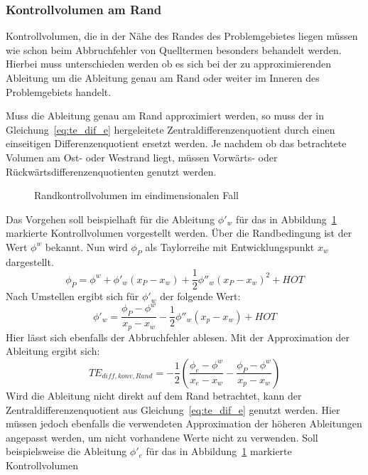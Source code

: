 \subsubsection{Kontrollvolumen am Rand}
\label{sec:te_dif_rand}

Kontrollvolumen, die in der Nähe des Randes des Problemgebietes liegen müssen wie schon beim
Abbruchfehler von Quelltermen besonders behandelt werden. Hierbei muss unterschieden werden ob es sich
bei der zu approximierenden Ableitung um die Ableitung genau am Rand oder weiter im Inneren des
Problemgebiets handelt.

Muss die Ableitung genau am Rand approximiert werden, so muss der in Gleichung~\ref{eq:te_dif_e} hergeleitete
Zentraldifferenzenquotient durch einen einseitigen Differenzenquotient ersetzt werden. Je nachdem ob das
betrachtete Volumen am Ost- oder Westrand liegt, müssen Vorwärts- oder Rückwärtsdifferenzenquotienten genutzt werden.
\begin{figure}[hb]

\centering
\caption{Randkontrollvolumen im eindimensionalen Fall}
\label{fig:kv1d_rand}
\end{figure}
Das Vorgehen soll beispielhaft für die Ableitung $\phi'_w$ für das in Abbildung~\ref{fig:kv1d_rand} markierte Kontrollvolumen
vorgestellt werden.
Über die Randbedingung ist der Wert $\phi^w$ bekannt. Nun wird $\phi_P$ als Taylorreihe mit Entwicklungspunkt
$x_w$ dargestellt.
\begin{equation*}
  \phi_P = \phi^w + \phi'_w (x_P-x_w) + \frac{1}{2} \phi''_w (x_P-x_w)^2 + HOT
\end{equation*}
Nach Umstellen ergibt sich für $\phi'_w$ der folgende Wert:
\begin{equation}
  \phi'_w = \frac{\phi_P-\phi^w}{x_p-x_w} -\frac{1}{2} \phi''_w(x_p-x_w) + HOT
\end{equation}
Hier lässt sich ebenfalls der Abbruchfehler ablesen. Mit der Approximation der Ableitung
ergibt sich:
\begin{equation}
  TE_{diff, konv, Rand} = -\frac{1}{2} \left({\frac{\phi_e-\phi^w}{x_e-x_w}-
  \frac{\phi_P-\phi^w}{x_p-x_w} }\right)
\end{equation}
Wird die Ableitung nicht direkt auf dem Rand betrachtet, kann der Zentraldifferenzenquotient
aus Gleichung~\ref{eq:te_dif_e} genutzt werden. Hier müssen jedoch ebenfalls die verwendeten
Approximation der höheren Ableitungen angepasst werden, um nicht vorhandene Werte nicht zu verwenden.
Soll beispielsweise die Ableitung $\phi'_e$ für das in Abbildung~\ref{fig:kv1d_rand} markierte Kontrollvolumen

